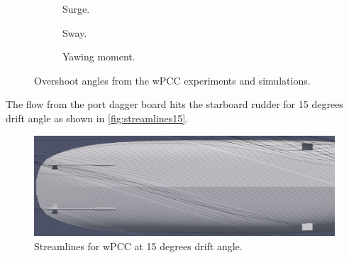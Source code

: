 \begin{figure}[h]
     \centering
     \begin{subfigure}[b]{0.49\textwidth}
         \centering
         
        \caption{Surge.}
        \label{fig:drift_angle_X}
     \end{subfigure}
     \hfill
     \begin{subfigure}[b]{0.49\textwidth}
         \centering
         
        \caption{Sway.}
        \label{fig:drift_angle_Y}
     \end{subfigure}
     \vfill
     \begin{subfigure}[b]{\textwidth}
         \centering
         
        \caption{Yawing moment.}
        \label{fig:drift_angle_N}
     \end{subfigure}
    \caption{Overshoot angles from the wPCC experiments and simulations.}
    \label{fig:overshoots_wPCC}
\end{figure}


The flow from the port dagger board hits the starboard rudder for 15 degrees drift angle as shown in \autoref{fig:streamlines15}.
\begin{figure}[h]
    \centering
    \includegraphics[width=\textwidth]{figures/paraview_drift_15.png}
    \caption{Streamlines for wPCC at 15 degrees drift angle.}
    \label{fig:streamlines15}
\end{figure}